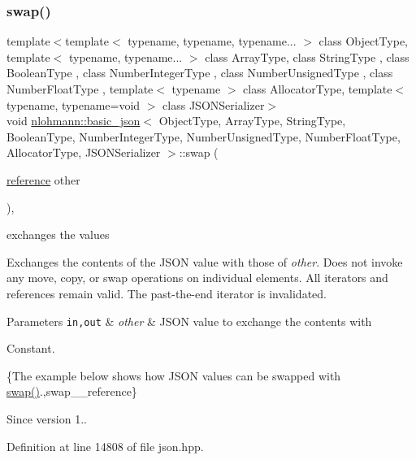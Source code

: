 \subsubsection{\texorpdfstring{swap()}{swap()}\hspace{0.1cm}{\footnotesize\ttfamily [1/4]}}
{\footnotesize\ttfamily template$<$template$<$ typename, typename, typename... $>$ class Object\+Type, template$<$ typename, typename... $>$ class Array\+Type, class String\+Type , class Boolean\+Type , class Number\+Integer\+Type , class Number\+Unsigned\+Type , class Number\+Float\+Type , template$<$ typename $>$ class Allocator\+Type, template$<$ typename, typename=void $>$ class J\+S\+O\+N\+Serializer$>$ \\
void \hyperlink{classnlohmann_1_1basic__json}{nlohmann\+::basic\+\_\+json}$<$ Object\+Type, Array\+Type, String\+Type, Boolean\+Type, Number\+Integer\+Type, Number\+Unsigned\+Type, Number\+Float\+Type, Allocator\+Type, J\+S\+O\+N\+Serializer $>$\+::swap (\begin{DoxyParamCaption}\item[{\hyperlink{classnlohmann_1_1basic__json_ac6a5eddd156c776ac75ff54cfe54a5bc}{reference}}]{other }\end{DoxyParamCaption})\hspace{0.3cm}{\ttfamily [inline]}, {\ttfamily [noexcept]}}



exchanges the values 

Exchanges the contents of the J\+S\+ON value with those of {\itshape other}. Does not invoke any move, copy, or swap operations on individual elements. All iterators and references remain valid. The past-\/the-\/end iterator is invalidated.


\begin{DoxyParams}[1]{Parameters}
\mbox{\tt in,out}  & {\em other} & J\+S\+ON value to exchange the contents with\\
\hline
\end{DoxyParams}
Constant.

\{The example below shows how J\+S\+ON values can be swapped with {\ttfamily \hyperlink{classnlohmann_1_1basic__json_a8c9d932353e1ab98a7dc2fc27e002031}{swap()}}.,swap\+\_\+\+\_\+reference\}

\begin{DoxySince}{Since}
version 1.. 
\end{DoxySince}


Definition at line 14808 of file json.\+hpp.


